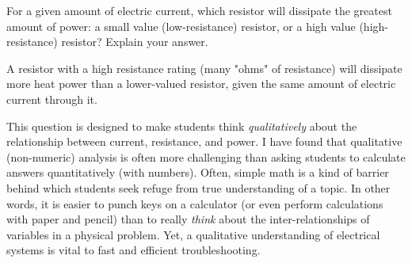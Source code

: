 

For a given amount of electric current, which resistor will dissipate the greatest amount of power: a small value (low-resistance) resistor, or a high value (high-resistance) resistor?  Explain your answer.







A resistor with a high resistance rating (many "ohms" of resistance) will dissipate more heat power than a lower-valued resistor, given the same amount of electric current through it.







This question is designed to make students think {\it qualitatively} about the relationship between current, resistance, and power.  I have found that qualitative (non-numeric) analysis is often more challenging than asking students to calculate answers quantitatively (with numbers).  Often, simple math is a kind of barrier behind which students seek refuge from true understanding of a topic.  In other words, it is easier to punch keys on a calculator (or even perform calculations with paper and pencil) than to really {\it think} about the inter-relationships of variables in a physical problem.  Yet, a qualitative understanding of electrical systems is vital to fast and efficient troubleshooting.




